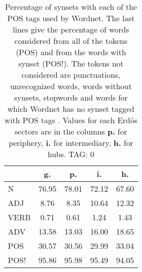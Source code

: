 \begin{table}[h!]
\begin{center}
\begin{tabular}{| l || c | c | c | c |}\hline
 & {\bf g.} & {\bf p.} & {\bf i.} & {\bf h.} \\\hline\hline
N & 76.95  & 78.01  & 72.12  & 67.60 \\\hline
ADJ & 8.76  & 8.35  & 10.64  & 12.32 \\\hline
VERB & 0.71  & 0.61  & 1.24  & 1.43 \\\hline
ADV & 13.58  & 13.03  & 16.00  & 18.65 \\\hline\hline
POS & 30.57  & 30.56  & 29.99  & 33.04 \\\hline
POS! & 95.86  & 95.98  & 95.49  & 94.05 \\\hline
\end{tabular}
\caption{Percentage of synsets with each of the POS tags used by Wordnet. The last lines give the percentage of words considered from all of the tokens (POS) and from the words with synset (POS!). The tokens not considered are punctuations, unrecognized words, words without synsets, stopwords and words for which Wordnet has no synset  tagged with POS tags . Values for each Erd\"os sectors are in the columns {{\bf p.}} for periphery, {{\bf i.}} for intermediary, {{\bf h.}} for hubs. TAG: 0}
\end{center}
\end{table}